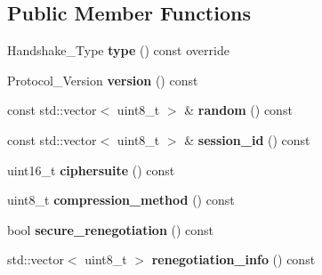 \subsection*{Public Member Functions}
\begin{DoxyCompactItemize}
\item 
\mbox{\label{class_botan_1_1_t_l_s_1_1_server___hello_a2e7d2d74c21312a9a529bff460a624b1}} 
Handshake\+\_\+\+Type {\bfseries type} () const override
\item 
\mbox{\label{class_botan_1_1_t_l_s_1_1_server___hello_ab0ea92e3bc88b7ce3bfa1375ada96621}} 
Protocol\+\_\+\+Version {\bfseries version} () const
\item 
\mbox{\label{class_botan_1_1_t_l_s_1_1_server___hello_a96aeea79169892a102ff9b135e0ff72b}} 
const std\+::vector$<$ uint8\+\_\+t $>$ \& {\bfseries random} () const
\item 
\mbox{\label{class_botan_1_1_t_l_s_1_1_server___hello_ae5ef5f2edf115291f8a9391202b8dfbc}} 
const std\+::vector$<$ uint8\+\_\+t $>$ \& {\bfseries session\+\_\+id} () const
\item 
\mbox{\label{class_botan_1_1_t_l_s_1_1_server___hello_a0fe70e754f6c21dd68afdfd29624d13b}} 
uint16\+\_\+t {\bfseries ciphersuite} () const
\item 
\mbox{\label{class_botan_1_1_t_l_s_1_1_server___hello_a3d2ae3d21a68a9fa116c275b464eece4}} 
uint8\+\_\+t {\bfseries compression\+\_\+method} () const
\item 
\mbox{\label{class_botan_1_1_t_l_s_1_1_server___hello_aa54d992ffe3abc194024f3f598e3e440}} 
bool {\bfseries secure\+\_\+renegotiation} () const
\item 
\mbox{\label{class_botan_1_1_t_l_s_1_1_server___hello_a909ae7ce21b588b168121fc7ae72830a}} 
std\+::vector$<$ uint8\+\_\+t $>$ {\bfseries renegotiation\+\_\+info} () const
\item 

\end{DoxyCompactItemize}
